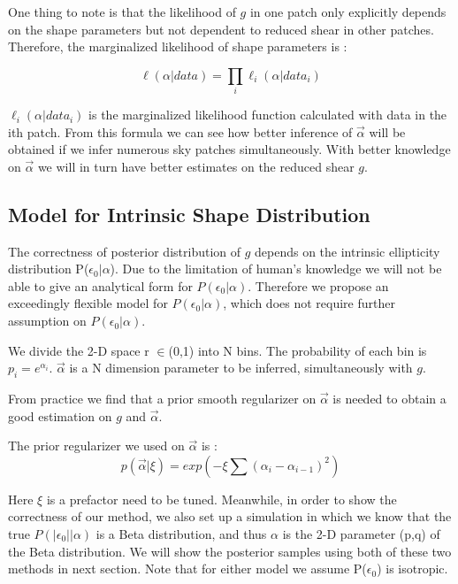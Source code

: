 \documentclass[useAMS,usenatbib]{mn2e}
\begin{document}
One thing to note is that the likelihood of $g$ in one patch only explicitly depends
on the shape parameters but not dependent to reduced shear in other patches. Therefore, the
marginalized likelihood of shape parameters is :

\begin{equation}
\ell(\alpha|data)=\prod_{i}\ell_{i}(\alpha|data_{i})
\end{equation}


$\ell_{i}(\alpha|data_{i})$ is the marginalized likelihood function
calculated with data in the ith patch. From this formula we can see
how better inference of $\vec{\alpha}$ will be obtained if we infer numerous
sky patches simultaneously. With better knowledge on $\vec{\alpha}$ we
will in turn have better estimates on the reduced shear $g$.


\subsection{Model for Intrinsic Shape Distribution}

The correctness of posterior distribution of $g$ depends on the intrinsic
ellipticity distribution P($\epsilon_{0}|\alpha$). Due to the limitation
of human's knowledge we will not be able to give an analytical form for
$P(\epsilon_{0}|\alpha)$. Therefore we propose an exceedingly flexible
model for $P(\epsilon_{0}|\alpha)$, which does not require further
assumption on $P(\epsilon_{0}|\alpha)$.

We divide the 2-D space r $\in$(0,1) into N bins. The probability
of each bin is $p_{i}=e^{\alpha_{i}}$. $\overrightarrow{\alpha}$
is a N dimension parameter to be inferred, simultaneously with $g$.

From practice we find that a prior smooth regularizer on $\vec{\alpha}$
is needed to obtain a good estimation on $g$ and $\vec{\alpha}$.

The prior regularizer we used on $\vec{\alpha}$ is : 
\begin{equation}
p(\vec{\alpha}|\xi)=exp(-\xi\sum(\alpha_{i}-\alpha_{i-1})^{2})
\end{equation}

Here $\xi$ is a prefactor need to be tuned.
Meanwhile, in order to show the correctness of our method, we also
set up a simulation in which we know that the true $P(|\epsilon_{0}||\alpha)$
is a Beta distribution, and thus $\alpha$ is the 2-D parameter (p,q)
of the Beta distribution. We will show the posterior samples using
both of these two methods in next section. Note that for either model
we assume P($\epsilon_{0}$) is isotropic.
\end{document}
